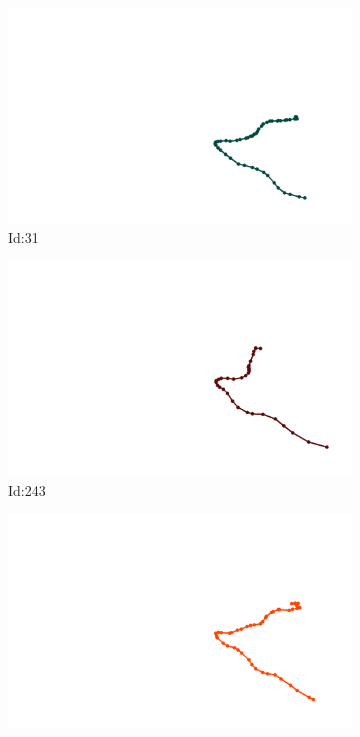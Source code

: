 \documentclass[12pt,twoside]{report}
\begin{document}
\begin{figure}
\centering
\begin{subfigure}[b]{0.20\textwidth}
\centering
\includegraphics[width=\textwidth]{../../trajectories/31.png}
\caption{Id:31}
\end{subfigure}
\begin{subfigure}[b]{0.20\textwidth}
\centering
\includegraphics[width=\textwidth]{../../trajectories/243.png}
\caption{Id:243}
\end{subfigure}
\begin{subfigure}[b]{0.20\textwidth}
\centering
\includegraphics[width=\textwidth]{../../trajectories/300.png}

\end{subfigure}
\end{figure}
\end{document}

